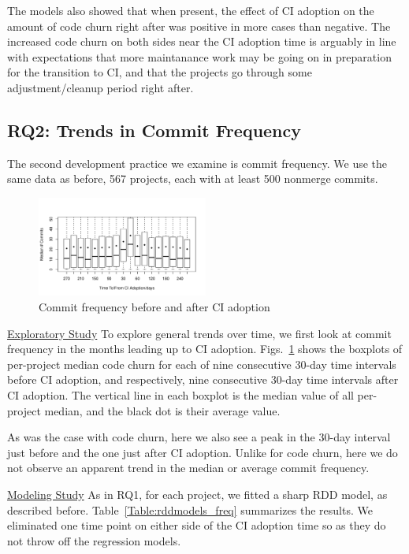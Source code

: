 The models also showed that when present, the effect of CI adoption on the amount of code churn right after was positive in more cases than negative.
The increased code churn on both sides near the CI adoption time is arguably in line with expectations that more maintanance work may be going on in preparation for the transition to CI, and that the projects go through some adjustment/cleanup period right after.


\subsection{RQ2: Trends in Commit Frequency}

The second development practice we examine is commit frequency.
We use the same data as before, 567 projects, each with at least 500 nonmerge commits.

\begin{figure}[!t]
\centering
\includegraphics[width=0.5\textwidth]{numbercommits.pdf}
\caption{Commit frequency before and after CI adoption}
\label{Fig:NumberCommits}
\end{figure}

\noindent \underline{Exploratory Study} To explore general trends over time, we first look at commit frequency in the months leading up to CI adoption.
Figs.~\ref{Fig:NumberCommits} shows the boxplots of per-project median code churn for each of nine consecutive 30-day time intervals before CI adoption, and respectively, nine consecutive 30-day time intervals after CI adoption.
The vertical line in each boxplot is the median value of all per-project median, and the black dot is their average value.

As was the case with code churn, here we also see a peak in the 30-day interval just before and the one just after CI adoption.
Unlike for code churn, here we do not observe an apparent trend in the median or average commit frequency.

\noindent \underline{Modeling Study} 
As in RQ1, for each project, we fitted a sharp RDD model, as described before.
Table~\ref{Table:rddmodels_freq} summarizes the results.
We eliminated one time point on either side of the CI adoption time so as they do not throw off the regression models.


